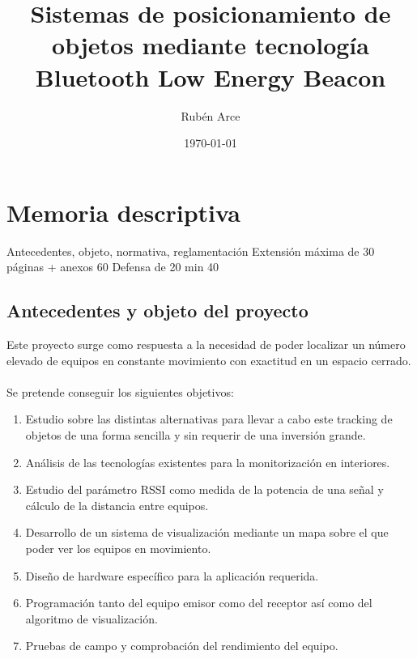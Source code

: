 \documentclass[a4paper ,12pt, onecolumn]{article}
\begin{document}
\title{Sistemas de posicionamiento de objetos mediante tecnología Bluetooth Low Energy Beacon }
\author{Rubén Arce}
\date{\today}
\maketitle
\cleardoublepage
\tableofcontents
\cleardoublepage
\section{Memoria descriptiva}
    Antecedentes, objeto, normativa, reglamentación
    Extensión máxima de 30 páginas + anexos 60
    Defensa de 20 min  40
    \subsection{Antecedentes y objeto del proyecto}
        Este proyecto surge como respuesta a la necesidad de poder localizar un número elevado de equipos en 
        constante movimiento con exactitud en un espacio cerrado.
        \paragraph{}
        Se pretende conseguir los siguientes objetivos:
        \begin{enumerate}
            \item Estudio sobre las distintas alternativas para llevar a cabo este tracking de objetos de una forma
            sencilla y sin requerir de una inversión grande.
            \item Análisis de las tecnologías existentes para la monitorización en interiores.
            \item Estudio del parámetro RSSI como medida de la potencia de una señal y cálculo de la distancia entre equipos.
            \item Desarrollo de un sistema de visualización mediante un mapa sobre el que poder ver los equipos en movimiento.
            \item Diseño de hardware específico para la aplicación requerida.
            \item Programación tanto del equipo emisor como del receptor así como del algoritmo de visualización.
            \item Pruebas de campo y comprobación del rendimiento del equipo.
        \end{enumerate}
\end{document}
